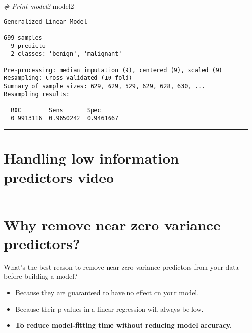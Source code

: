 \documentclass[]{book}
\newenvironment{Shaded}{\begin{snugshade}}{\end{snugshade}}
\newcommand{\CommentTok}[1]{\textcolor[rgb]{0.56,0.35,0.01}{\textit{#1}}}
\newcommand{\NormalTok}[1]{#1}
\begin{document}
\begin{Shaded}
\begin{Highlighting}[]
\CommentTok{# Print model2}
\NormalTok{model2}
\end{Highlighting}
\end{Shaded}

\begin{verbatim}
Generalized Linear Model 

699 samples
  9 predictor
  2 classes: 'benign', 'malignant' 

Pre-processing: median imputation (9), centered (9), scaled (9) 
Resampling: Cross-Validated (10 fold) 
Summary of sample sizes: 629, 629, 629, 629, 628, 630, ... 
Resampling results:

  ROC        Sens       Spec     
  0.9913116  0.9650242  0.9461667
\end{verbatim}

\begin{center}\rule{0.5\linewidth}{\linethickness}\end{center}

\section*{Handling low information predictors
video}\label{handling-low-information-predictors-video}

\begin{center}\rule{0.5\linewidth}{\linethickness}\end{center}

\section*{Why remove near zero variance
predictors?}\label{why-remove-near-zero-variance-predictors}

What's the best reason to remove near zero variance predictors from your
data before building a model?

\begin{itemize}
\item
  Because they are guaranteed to have no effect on your model.
\item
  Because their p-values in a linear regression will always be low.
\item
  \textbf{To reduce model-fitting time without reducing model accuracy.}
\end{itemize}
\end{document}

